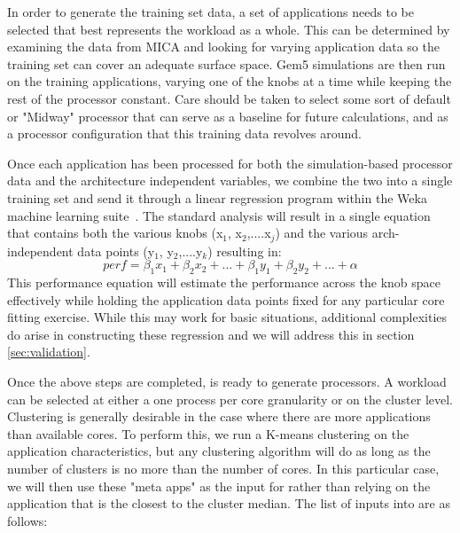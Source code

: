 In order to generate the training set data, a set of applications
needs to be selected that best represents the workload as a
whole. This can be determined by examining the data from MICA and 
looking for varying application data so the training set can cover an adequate
surface space. Gem5 simulations are then run on the training applications, 
varying one of the knobs at a time while keeping the rest of the processor constant. 
Care should be taken to select some sort of default or "Midway" processor
that can serve as a baseline for future calculations, and as a
processor configuration that this training data revolves around. 

Once each application has been processed for both the simulation-based
processor data and the architecture independent variables, we combine
the two into a single training set and send it through a linear
regression program within the Weka machine learning
suite~\cite{weka}. The standard analysis will result in a single
equation that contains both the various knobs (x$_{1}$,
x$_{2}$,....x$_{j}$) and the various arch-independent data points
(y$_{1}$, y$_{2}$,....y$_{k}$) resulting in:
\begin{equation}
perf = \beta _1x_1+\beta _2x_2+...+\beta _1y_1+\beta _2y_2+...+\alpha 
\end{equation}
This performance equation will estimate the performance across the knob space 
effectively while holding the application data points fixed for any particular
core fitting exercise. While this may work for basic situations, additional 
complexities do arise in constructing these regression and we will address this
in section \ref{sec:validation}.
 
Once the above steps are completed, \blackBox{} is ready to generate
processors.  A workload can be selected at either a one process per
core granularity or on the cluster level. Clustering is generally 
desirable in the case where there are more applications than available
cores. To perform this, we run a K-means clustering on
the application characteristics, but any clustering algorithm will
do as long as the number of clusters is no more than the number of cores. 
In this particular case, we will then use these "meta apps" as the
input for \blackBox{} rather than relying on the application that is
the closest to the cluster median. The list of inputs into \blackBox{}
are as follows:


